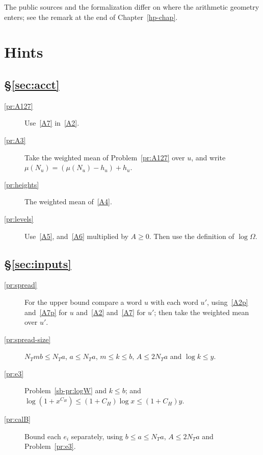 \documentclass[reqno]{amsart}
\newcounter{chap}
\theoremstyle{definition}
\theoremstyle{plain}
\begin{document}
{\begin{description}
\end{description}
}

The public sources and the formalization differ on where the arithmetic geometry enters; see the remark at the end of Chapter~\ref{hp-chap}.

\section*{Hints}

\subsection*{\S\ref{sec:acct}}
\begin{description}
\item[\ref{pr:A127}] Use~\eqref{A7} in~\eqref{A2}.
\item[\ref{pr:A3}] Take the weighted mean of Problem~\ref{pr:A127} over \(u\), and write \(\mu(N_u) = (\mu(N_u) - h_u) + h_u\).
\item[\ref{pr:heights}] The weighted mean of~\eqref{A4}.
\item[\ref{pr:levels}] Use~\eqref{A5}, and~\eqref{A6} multiplied by \(A \ge 0\).  Then use the definition of \(\log\Omega\).
\end{description}

\subsection*{\S\ref{sec:inputs}}
\begin{description}
\item[\ref{pr:spread}] For the upper bound compare a word \(u\) with each word \(u'\), using~\eqref{A2p} and~\eqref{A7p} for \(u\) and~\eqref{A2} and~\eqref{A7} for \(u'\); then take the weighted mean over \(u'\).
\item[\ref{pr:spread-size}] \(N_Tmb \le N_Ta\), \(a \le N_Ta\), \(m \le k \le b\), \(A \le 2N_Ta\) and \(\log k \le y\).
\item[\ref{pr:e3}] Problem~\ref{sb-pr:logW} and \(k \le b\); and \(\log(1 + x^{C_H}) \le (1 + C_H)\log x \le (1 + C_H)y\).
\item[\ref{pr:calB}] Bound each \(e_i\) separately, using \(b \le a \le N_Ta\), \(A \le 2N_Ta\) and Problem~\ref{pr:e3}.
\end{description}
\end{document}
